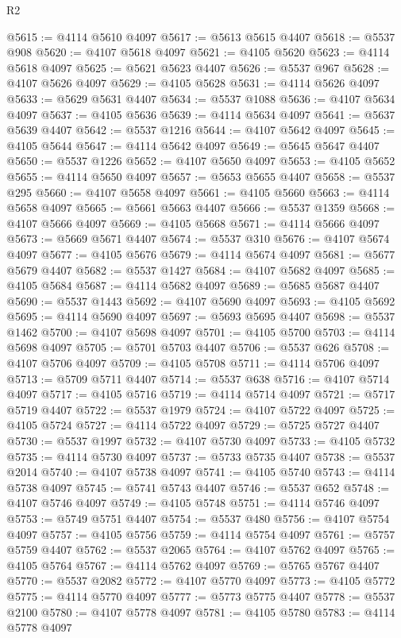 \begin{lexlean}{R2}
\begin{coremodule}
@5615 := @4114 @5610 @4097
@5617 := @5613 @5615 @4407
@5618 := @5537 @908
@5620 := @4107 @5618 @4097
@5621 := @4105 @5620
@5623 := @4114 @5618 @4097
@5625 := @5621 @5623 @4407
@5626 := @5537 @967
@5628 := @4107 @5626 @4097
@5629 := @4105 @5628
@5631 := @4114 @5626 @4097
@5633 := @5629 @5631 @4407
@5634 := @5537 @1088
@5636 := @4107 @5634 @4097
@5637 := @4105 @5636
@5639 := @4114 @5634 @4097
@5641 := @5637 @5639 @4407
@5642 := @5537 @1216
@5644 := @4107 @5642 @4097
@5645 := @4105 @5644
@5647 := @4114 @5642 @4097
@5649 := @5645 @5647 @4407
@5650 := @5537 @1226
@5652 := @4107 @5650 @4097
@5653 := @4105 @5652
@5655 := @4114 @5650 @4097
@5657 := @5653 @5655 @4407
@5658 := @5537 @295
@5660 := @4107 @5658 @4097
@5661 := @4105 @5660
@5663 := @4114 @5658 @4097
@5665 := @5661 @5663 @4407
@5666 := @5537 @1359
@5668 := @4107 @5666 @4097
@5669 := @4105 @5668
@5671 := @4114 @5666 @4097
@5673 := @5669 @5671 @4407
@5674 := @5537 @310
@5676 := @4107 @5674 @4097
@5677 := @4105 @5676
@5679 := @4114 @5674 @4097
@5681 := @5677 @5679 @4407
@5682 := @5537 @1427
@5684 := @4107 @5682 @4097
@5685 := @4105 @5684
@5687 := @4114 @5682 @4097
@5689 := @5685 @5687 @4407
@5690 := @5537 @1443
@5692 := @4107 @5690 @4097
@5693 := @4105 @5692
@5695 := @4114 @5690 @4097
@5697 := @5693 @5695 @4407
@5698 := @5537 @1462
@5700 := @4107 @5698 @4097
@5701 := @4105 @5700
@5703 := @4114 @5698 @4097
@5705 := @5701 @5703 @4407
@5706 := @5537 @626
@5708 := @4107 @5706 @4097
@5709 := @4105 @5708
@5711 := @4114 @5706 @4097
@5713 := @5709 @5711 @4407
@5714 := @5537 @638
@5716 := @4107 @5714 @4097
@5717 := @4105 @5716
@5719 := @4114 @5714 @4097
@5721 := @5717 @5719 @4407
@5722 := @5537 @1979
@5724 := @4107 @5722 @4097
@5725 := @4105 @5724
@5727 := @4114 @5722 @4097
@5729 := @5725 @5727 @4407
@5730 := @5537 @1997
@5732 := @4107 @5730 @4097
@5733 := @4105 @5732
@5735 := @4114 @5730 @4097
@5737 := @5733 @5735 @4407
@5738 := @5537 @2014
@5740 := @4107 @5738 @4097
@5741 := @4105 @5740
@5743 := @4114 @5738 @4097
@5745 := @5741 @5743 @4407
@5746 := @5537 @652
@5748 := @4107 @5746 @4097
@5749 := @4105 @5748
@5751 := @4114 @5746 @4097
@5753 := @5749 @5751 @4407
@5754 := @5537 @480
@5756 := @4107 @5754 @4097
@5757 := @4105 @5756
@5759 := @4114 @5754 @4097
@5761 := @5757 @5759 @4407
@5762 := @5537 @2065
@5764 := @4107 @5762 @4097
@5765 := @4105 @5764
@5767 := @4114 @5762 @4097
@5769 := @5765 @5767 @4407
@5770 := @5537 @2082
@5772 := @4107 @5770 @4097
@5773 := @4105 @5772
@5775 := @4114 @5770 @4097
@5777 := @5773 @5775 @4407
@5778 := @5537 @2100
@5780 := @4107 @5778 @4097
@5781 := @4105 @5780
@5783 := @4114 @5778 @4097

\end{coremodule}
\end{lexlean}
